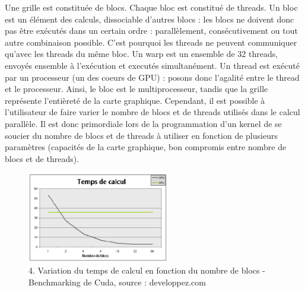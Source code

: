 \documentclass{report}
\begin{document}
\begin{itemize}
Une grille est constituée de blocs. Chaque bloc est constitué de threads. Un bloc est un élément des calculs, dissociable d'autres blocs : les blocs ne doivent donc pas être exécutés dans un certain ordre : parallèlement, consécutivement ou tout autre combinaison possible. C'est pourquoi les threads ne peuvent communiquer qu'avec les threads du même bloc.\newline
Un warp est un ensemble de 32 threads, envoyés ensemble à l'exécution et executés simultanément. Un thread est exécuté par un processeur (un des coeurs de GPU) : posons donc l'agalité entre le thread et le processeur.\newline
Ainsi, le bloc est le multiprocesseur, tandis que la grille représente l'entièreté de la carte graphique. \newline
Cependant, il est possible à l'utilisateur de faire varier le nombre de blocs et de threads utilisés dans le calcul parallèle. Il est donc primordiale lors de la programmation d'un kernel de se soucier du nombre de blocs et de threads à utiliser en fonction de plusieurs paramètres (capacités de la carte graphique, bon compromis entre nombre de blocs et de threads).

\begin{figure}[!h]
\begin{center}
\includegraphics[height=150]{image_benchmark_cuda.png}
\end{center}
\caption{4. Variation du temps de calcul en fonction du nombre de blocs - Benchmarking de Cuda, source : developpez.com}
\label{test}
\end{figure} \newline


\end{itemize}
\end{document}
